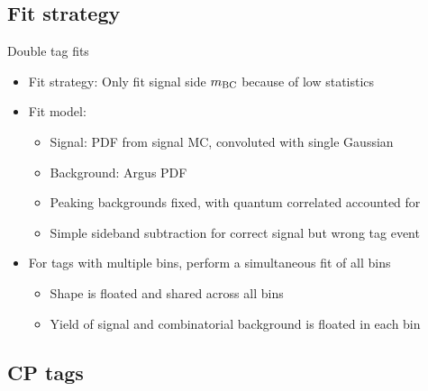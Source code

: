 \documentclass{beamer}
\begin{document}
\subsection{Fit strategy}

\begin{frame}{Double tag fits}
  \begin{itemize}
    \setlength\itemsep{1.0em}
    \item{Fit strategy: Only fit signal side $m_{\rm BC}$ because of low statistics}
    \item{Fit model:}
    \begin{itemize}
      \item{Signal: PDF from signal MC, convoluted with single Gaussian}
      \item{Background: Argus PDF}
      \item{Peaking backgrounds fixed, with quantum correlated accounted for}
      \item{Simple sideband subtraction for correct signal but wrong tag event}
    \end{itemize}
    \item{For tags with multiple bins, perform a simultaneous fit of all bins}
    \begin{itemize}
      \item{Shape is floated and shared across all bins}
      \item{Yield of signal and combinatorial background is floated in each bin}
    \end{itemize}
  \end{itemize}
\end{frame}

\subsection{CP tags}
\end{document}
